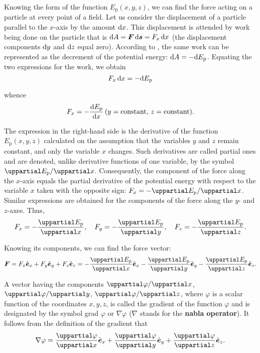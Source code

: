 Knowing the form of the function $E_{\text{p}}(x,y,z)$, we can find the force acting on a particle at every point of a field. Let us consider the displacement of a particle parallel to the $x$-axis by the amount $\mathrm{d} x$. This displacement is attended by work being done on the particle that is $\mathrm{d} A=\boldsymbol{F}\,\mathrm{d}\boldsymbol{s}=F_x\,\mathrm{d} x$ (the displacement components $\mathrm{d} y$ and $\mathrm{d} z$ equal zero). According to , the same work can be represented as the decrement of the potential energy: $\mathrm{d} A=-\mathrm{d} E_{\text{p}}$. Equating the two expressions for the work, we obtain
\begin{equation*}
F_x\,\mathrm{d} x = -\mathrm{d} E_{\text{p}}
\end{equation*}

\noindent
whence
\begin{equation*}
F_x = -\frac{\mathrm{d} E_{\text{p}}}{\mathrm{d} x}\, (y=\text{constant},\, z=\text{constant}).
\end{equation*}

\noindent
The expression in the right-hand side is the derivative of the function $E_{\text{p}}(x,y,z)$ calculated on the assumption that the variables $y$ and $z$ remain constant, and only the variable $x$ changes. Such derivatives are called partial ones and are denoted, unlike derivative functions of one variable, by the symbol $\diffinpartial{E_{\text{p}}}{x}$. Consequently, the component of the force along the $x$-axis equals the partial derivative of the potential energy with respect to the variable $x$ taken with the opposite sign: $F_x=-\diffinpartial{E_{\text{p}}}{x}$. Similar expressions are obtained for the components of the force along the $y$- and $z$-axes. Thus,
\begin{equation}\label{eq:3_29}
F_x = -\diffpartial{E_{\text{p}}}{x},\quad F_y = -\diffpartial{E_{\text{p}}}{y},\quad F_z = -\diffpartial{E_{\text{p}}}{z}.
\end{equation}

Knowing its components, we can find the force vector:
\begin{equation}\label{eq:3_30}
\vec{F} = F_x\vecuni{x} + F_y\vecuni{y} + F_z\vecuni{z} = 
-\diffpartial{E_{\text{p}}}{x}\vecuni{x} - \diffpartial{E_{\text{p}}}{y}\vecuni{y} -\diffpartial{E_{\text{p}}}{z}\vecuni{z}.
\end{equation}

A vector having the components $\diffinpartial{\varphi}{x}$,  $\diffinpartial{\varphi}{y}$, $\diffinpartial{\varphi}{z}$, where $\varphi$ is a scalar function of the coordinates $x,y,z$, is called the gradient of the function $\varphi$ and is designated by the symbol grad $\varphi$ or $\nabla\varphi$ ($\nabla$ stands for the \textbf{nabla operator}). It follows from the definition of the gradient that
\begin{equation}\label{eq:3_31}
\nabla\varphi = \diffpartial{\varphi}{x}\vecuni{x} + \diffpartial{\varphi}{y}\vecuni{y} + \diffpartial{\varphi}{z}\vecuni{z}.
\end{equation}

